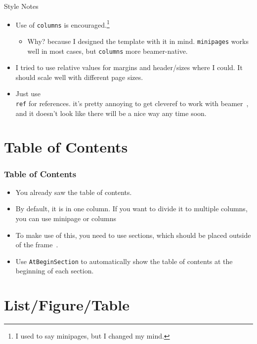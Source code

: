 \documentclass[
	10pt, %
	aspectratio=169, %
]{beamer}
\begin{document}
\begin{frame}{Style Notes}
	\begin{itemize}
		\item Use of \texttt{columns} is encouraged.\footnote{I used to say minipages, but I changed my mind.}
		      \begin{itemize}
			      \item Why? because I designed the template with it in mind. \texttt{minipages} works well in most cases, but \texttt{columns} more beamer-native.
		      \end{itemize}
		\item I tried to use relative values for margins and header/sizes where I could. It should scale well with different page sizes.
		\item Just use \texttt{\\ref} for references. it's pretty annoying to get cleveref to work with beamer~\cite{cleveref_beamer}, and it doesn't look like there will be a nice way any time soon.
	\end{itemize}
\end{frame}


\section{Table of Contents}
\begin{frame}
	\frametitle{Table of Contents}
	\begin{itemize}
		\item You already saw the table of contents.
		\item By default, it is in one column. If you want to divide it to multiple columns, you can use minipage or columns~\cite{samcarter_is_at_topanswers.xyzAnswerBeamerVertical2013}
		\item To make use of this, you need to use sections, which should be placed outside of the frame~\cite{campaAnswerAtbeginsectionReturns2022}.
		\item Use \texttt{AtBeginSection} to automatically show the table of contents at the beginning of each section.
	\end{itemize}
\end{frame}


\section{List/Figure/Table}
\end{document}
